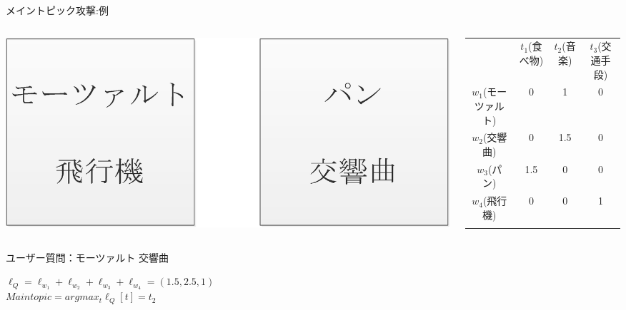 \documentclass[14pt,xcolor=dvipsnames,table,dvipdfmx]{beamer}
\begin{document}
\begin{frame}{メイントピック攻撃:例}
	\begin{exampleblock}{}
      		 \begin{columns}[c]
           		\begin{column}{0.3\textwidth} %
               		\includegraphics[width=\columnwidth]{rk16.png}
		   	\end{column}
       		\begin{column}{0.68\textwidth} %
\fontsize{9pt}{7.2}\selectfont
				\begin{tabular}{|c|c|c|c|}
				\noalign{\hrule height 1pt}
				  & $t_1$(食べ物) & $t_2$(音楽) & $t_3$(交通手段) \\
				\noalign{\hrule height 1pt}
				$w_1$(モーツァルト) & 0 & 1 & 0 \\
				\noalign{\hrule height 1pt}
				$w_2$(交響曲) & 0 & 1.5 & 0 \\
				\noalign{\hrule height 1pt}
				$w_3$(パン) & 1.5 & 0 & 0 \\
				\noalign{\hrule height 1pt}
				$w_4$(飛行機) & 0 & 0 & 1 \\
				\noalign{\hrule height 1pt}
				\end{tabular}
			\end{column}
		\end{columns}
		ユーザー質問：モーツァルト 交響曲
	\end{exampleblock}
	\begin{block}{}
   		$\ell_Q = \ell_{w_1} + \ell_{w_2} + \ell_{w_3} + \ell_{w_4} = (1.5,2.5,1)$ \\
   		$Maintopic = argmax_t \ell_Q[t] = t_2 $
	\end{block}
\end{frame}
\end{document}
